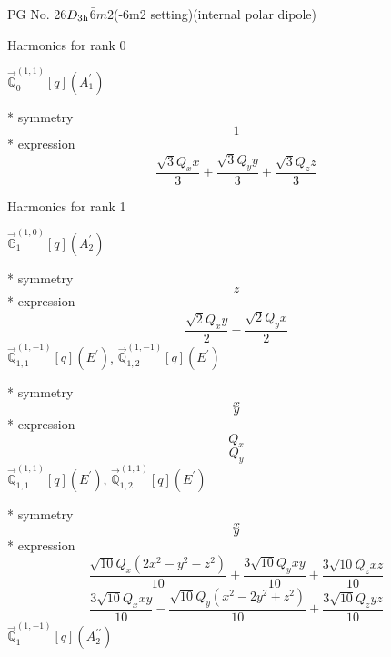 \documentclass[fleqn,8pt]{jsarticle}
\begin{document}
\setcounter{MaxMatrixCols}{32}

\renewcommand{\tablename}{Table~}
\renewcommand{\figurename}{Figure~}
\begin{center}
\LARGE
PG No. 26\quad$D_{\rm 3h}$\quad$\bar{6}m2$\quad(-6m2 setting)\quad[ hexagonal ] (internal polar dipole)
\end{center}

\noindent * Harmonics for rank 0

\noindent\quad $\vec{\mathbb{Q}}_{0}^{(1,1)}[q](A_{1}^{\prime})$

\noindent\quad ** symmetry
\begin{dmath*}
1
\end{dmath*}
\noindent\quad ** expression
\begin{dmath*}
\frac{\sqrt{3} Q_{x} x}{3} + \frac{\sqrt{3} Q_{y} y}{3} + \frac{\sqrt{3} Q_{z} z}{3}
\end{dmath*}

\noindent * Harmonics for rank 1

\noindent\quad $\vec{\mathbb{G}}_{1}^{(1,0)}[q](A_{2}^{\prime})$

\noindent\quad ** symmetry
\begin{dmath*}
z
\end{dmath*}
\noindent\quad ** expression
\begin{dmath*}
\frac{\sqrt{2} Q_{x} y}{2} - \frac{\sqrt{2} Q_{y} x}{2}
\end{dmath*}
\noindent\quad $\vec{\mathbb{Q}}_{1,1}^{(1,-1)}[q](E^{\prime})$, $\vec{\mathbb{Q}}_{1,2}^{(1,-1)}[q](E^{\prime})$

\noindent\quad ** symmetry
\begin{dmath*}
x
\end{dmath*}
\begin{dmath*}
y
\end{dmath*}
\noindent\quad ** expression
\begin{dmath*}
Q_{x}
\end{dmath*}
\begin{dmath*}
Q_{y}
\end{dmath*}
\noindent\quad $\vec{\mathbb{Q}}_{1,1}^{(1,1)}[q](E^{\prime})$, $\vec{\mathbb{Q}}_{1,2}^{(1,1)}[q](E^{\prime})$

\noindent\quad ** symmetry
\begin{dmath*}
x
\end{dmath*}
\begin{dmath*}
y
\end{dmath*}
\noindent\quad ** expression
\begin{dmath*}
\frac{\sqrt{10} Q_{x} \left(2 x^{2} - y^{2} - z^{2}\right)}{10} + \frac{3 \sqrt{10} Q_{y} x y}{10} + \frac{3 \sqrt{10} Q_{z} x z}{10}
\end{dmath*}
\begin{dmath*}
\frac{3 \sqrt{10} Q_{x} x y}{10} - \frac{\sqrt{10} Q_{y} \left(x^{2} - 2 y^{2} + z^{2}\right)}{10} + \frac{3 \sqrt{10} Q_{z} y z}{10}
\end{dmath*}
\noindent\quad $\vec{\mathbb{Q}}_{1}^{(1,-1)}[q](A_{2}^{\prime\prime})$
\end{document}
